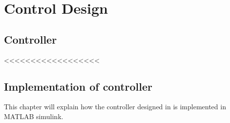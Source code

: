 \part{Control Design}
\label{control_design}

\chapter{Controller}
\label{Controller}


<<<<<<<<<<<<<<<<<<









\chapter{Implementation of controller}




\label{implementation_of_controller}

This chapter will explain how the controller designed in  is implemented in MATLAB simulink.
